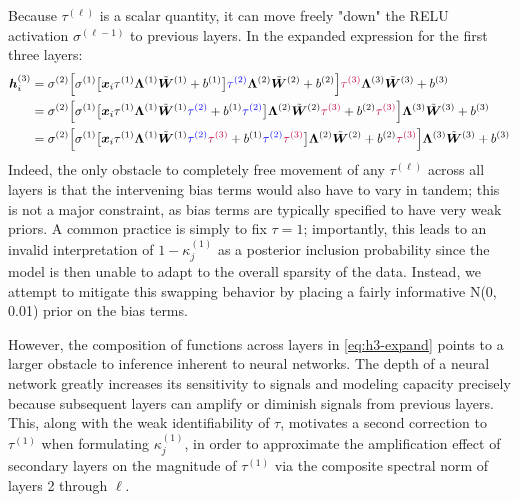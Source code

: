 Because $\tau^{(\ell)}$ is a scalar quantity, it can move freely "down" the RELU activation $\sigma^{(\ell-1)}$ to previous layers.  In the expanded expression for the first three layers:
\begin{equation}
    \begin{aligned}
        \bm h_i^{(3)} 
        & =  \sigma^{(2)} \Big[
                  \sigma^{(1)} \big[
                    \bm{x}_i \tau^{(1)} \bm\Lambda^{(1)} \tilde {\bm{W}}^{(1)} + b^{(1)}
                  \big]
                  \textcolor{blue}{\tau^{(2)}} \bm\Lambda^{(2)} \tilde {\bm{W}}^{(2)} + b^{(2)}
                \Big]
                \textcolor{purple}{\tau^{(3)}} \bm\Lambda^{(3)} \tilde {\bm{W}}^{(3)} + b^{(3)}
        \\
        & =  \sigma^{(2)} \Big[
                  \sigma^{(1)} \big[
                    \bm{x}_i \tau^{(1)} \bm\Lambda^{(1)} \tilde {\bm{W}}^{(1)} \textcolor{blue}{\tau^{(2)}}  + b^{(1)} \textcolor{blue}{\tau^{(2)}} 
                  \big]
                  \bm\Lambda^{(2)} \tilde {\bm{W}}^{(2)} \textcolor{purple}{\tau^{(3)}}+ b^{(2)}  \textcolor{purple}{\tau^{(3)}}
                \Big]
                 \bm\Lambda^{(3)} \tilde {\bm{W}}^{(3)} + b^{(3)}
        \\
        & =  \sigma^{(2)} \Big[
                  \sigma^{(1)} \big[
                    \bm{x}_i \tau^{(1)} \bm\Lambda^{(1)} \tilde {\bm{W}}^{(1)} \textcolor{blue}{\tau^{(2)}} \textcolor{purple}{\tau^{(3)}} + b^{(1)} \textcolor{blue}{\tau^{(2)}} \textcolor{purple}{\tau^{(3)}}
                  \big]
                  \bm\Lambda^{(2)} \tilde {\bm{W}}^{(2)} + b^{(2)}  \textcolor{purple}{\tau^{(3)}}
                \Big]
                 \bm\Lambda^{(3)} \tilde {\bm{W}}^{(3)} + b^{(3)}
    \end{aligned}
    \label{eq:h3-expand}
\end{equation}
Indeed, the only obstacle to completely free movement of any $\tau^{(\ell)}$ across all layers is that the intervening bias terms would also have to vary in tandem; this is not a major constraint, as bias terms are typically specified to have very weak priors.  A common practice is simply to fix $\tau = 1$; importantly, this leads to an invalid interpretation of $1 - \kappa_j^{(1)}$ as a posterior inclusion probability since the model is then unable to adapt to the overall sparsity of the data.  Instead, we attempt to mitigate this swapping behavior by placing a fairly informative N(0, 0.01) prior on the bias terms.

However, the composition of functions across layers in \ref{eq:h3-expand} points to a larger obstacle to inference inherent to neural networks.  The depth of a neural network greatly increases its sensitivity to signals and modeling capacity precisely because subsequent layers can amplify or diminish signals from previous layers.  This, along with the weak identifiability of $\tau$, motivates a second correction to $\tau^{(1)}$ when formulating $\kappa^{(1)}_j$, in order to approximate the amplification effect of secondary layers on the magnitude of $\tau^{(1)}$ via the composite spectral norm of layers 2 through $\ell$.  


